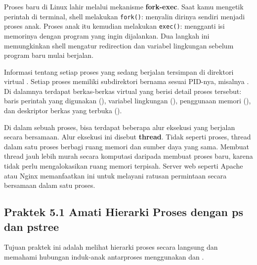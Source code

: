 Proses baru di Linux lahir melalui mekanisme \textbf{fork-exec}. Saat kamu mengetik
perintah di terminal, shell melakukan \texttt{fork()}: menyalin dirinya sendiri menjadi
proses anak. Proses anak itu kemudian melakukan \texttt{exec()}: mengganti isi memorinya
dengan program yang ingin dijalankan. Dua langkah ini memungkinkan shell mengatur
redirection dan variabel lingkungan sebelum program baru mulai berjalan.

Informasi tentang setiap proses yang sedang berjalan tersimpan di direktori virtual
. Setiap proses memiliki subdirektori bernama sesuai PID-nya, misalnya
. Di dalamnya terdapat berkas-berkas virtual yang berisi detail proses
tersebut: baris perintah yang digunakan (), variabel lingkungan
(), penggunaan memori (), dan deskriptor berkas yang terbuka
().

Di dalam sebuah proses, bisa terdapat beberapa alur eksekusi yang berjalan secara
bersamaan. Alur eksekusi ini disebut \textbf{thread}. Tidak seperti proses, thread dalam
satu proses berbagi ruang memori dan sumber daya yang sama. Membuat thread jauh lebih
murah secara komputasi daripada membuat proses baru, karena tidak perlu mengalokasikan
ruang memori terpisah. Server web seperti Apache atau Nginx memanfaatkan ini untuk
melayani ratusan permintaan secara bersamaan dalam satu proses.

\subsection*{Praktek 5.1 Amati Hierarki Proses dengan ps dan pstree}

Tujuan praktek ini adalah melihat hierarki proses secara langsung dan memahami hubungan
induk-anak antarproses menggunakan  dan .


